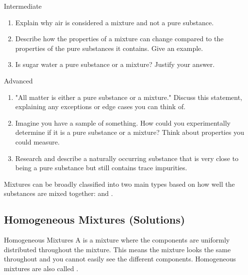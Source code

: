 \begin{tieredquestions}{Intermediate}
\begin{enumerate}
    \item Explain why air is considered a mixture and not a pure substance.
    \item Describe how the properties of a mixture can change compared to the properties of the pure substances it contains. Give an example.
    \item  Is sugar water a pure substance or a mixture? Justify your answer.
\end{enumerate}
\end{tieredquestions}

\begin{tieredquestions}{Advanced}
\begin{enumerate}
    \item  "All matter is either a pure substance or a mixture."  Discuss this statement, explaining any exceptions or edge cases you can think of.
    \item  Imagine you have a sample of something. How could you experimentally determine if it is a pure substance or a mixture?  Think about properties you could measure.
    \item  Research and describe a naturally occurring substance that is very close to being a pure substance but still contains trace impurities.
\end{enumerate}
\end{tieredquestions}


\FloatBarrier

Mixtures can be broadly classified into two main types based on how well the substances are mixed together:  and .

\subsection{Homogeneous Mixtures (Solutions)}


\begin{keyconcept}{Homogeneous Mixtures}
A  is a mixture where the components are uniformly distributed throughout the mixture. This means the mixture looks the same throughout and you cannot easily see the different components. Homogeneous mixtures are also called .
\end{keyconcept}

